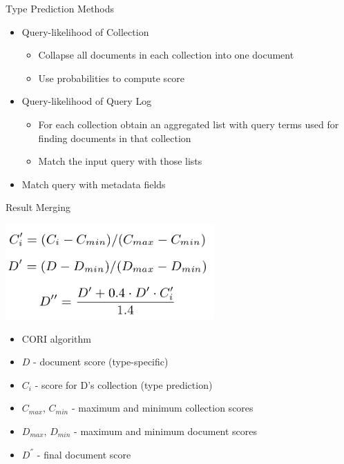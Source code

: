 \begin{frame}{Type Prediction}
  Methods
  \begin{itemize}
    \item Query-likelihood of Collection
      \begin{itemize}
      \item Collapse all documents in each collection into one document
      \item Use probabilities to compute score
      \end{itemize}
    \item Query-likelihood of Query Log
      \begin{itemize}
      \item For each collection obtain an aggregated list with query terms
        used for finding documents in that collection
      \item Match the input query with those lists
      \end{itemize}
    \item Match query with metadata fields
  \end{itemize}
\end{frame}

\begin{frame}{Result Merging}
  \begin{center}
    \includegraphics[width=0.6\textwidth]{img/cori.png}
  \end{center}

  \begin{itemize}
  \item CORI algorithm
  \item $D$ - document score (type-specific)
  \item $C_i$ - score for D's collection (type prediction)
  \item $C_{max}$, $C_{min}$ - maximum and minimum collection scores
  \item $D_{max}$, $D_{min}$ - maximum and minimum document scores
  \item $D^{''}$ - final document score
  \end{itemize}
\end{frame}
